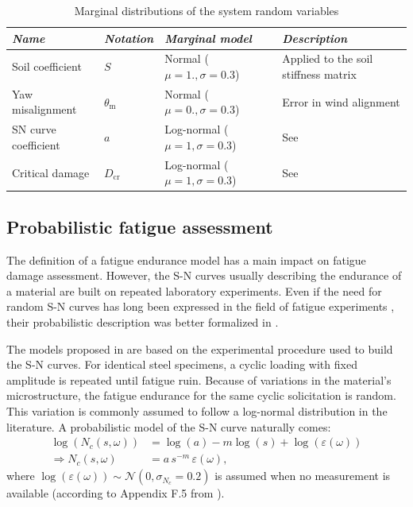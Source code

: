 \begin{table}[h!]
    \centering
    \begin{tabular}{ l l l l}
        \hline
        {\it Name} & {\it Notation} & {\it Marginal model} & {\it Description}\\
        \hline
        Soil coefficient & $S$ & Normal ($\mu=1., \sigma=0.3$) & Applied to the soil stiffness matrix\\
        Yaw misalignment & $\theta_{\mathrm{m}}$ & Normal ($\mu=0., \sigma=0.3$) & Error in wind alignment\\
        SN curve coefficient & $a$ & Log-normal ($\mu=1, \sigma=0.3$) & See \cite{guede_2007}\\
        Critical damage & $D_{\mathrm{cr}}$ & Log-normal ($\mu=1, \sigma=0.3$) & See \cite{drexler_musculus_2021}\\\hline
    \end{tabular}
    \caption{Marginal distributions of the system random variables}
    \label{tab:sys_variables}
\end{table}



\subsection{Probabilistic fatigue assessment}
The definition of a fatigue endurance model has a main impact on fatigue damage assessment. 
However, the S-N curves usually describing the endurance of a material are built on repeated laboratory experiments. 
Even if the need for random S-N curves has long been expressed in the field of fatigue experiments \citep{lieurade_1982_essais_fatigue}, their probabilistic description was better formalized in \citep{guede_2007,sudret_2013_fatigue}. 

The models proposed in \citet{guede_2007} are based on the experimental procedure used to build the S-N curves. 
For identical steel specimens, a cyclic loading with fixed amplitude is repeated until fatigue ruin. 
Because of variations in the material's microstructure, the fatigue endurance for the same cyclic solicitation is random. 
This variation is commonly assumed to follow a log-normal distribution in the literature. 
A probabilistic model of the S-N curve naturally comes: 
\begin{subequations}
    \begin{align}
        \log(N_c(s, \omega)) &= \log(a) - m \log(s) + \log(\varepsilon(\omega))\\
        \Rightarrow N_c(s, \omega) &= a \, s^{-m} \, \varepsilon(\omega),
    \end{align}
\end{subequations}
where $\log(\varepsilon(\omega)) \sim \mathcal{N}(0, \sigma_{N_c}=0.2)$ is assumed when no measurement is available (according to Appendix F.5 from \citealt{dnv_fatigue_2016}). 

